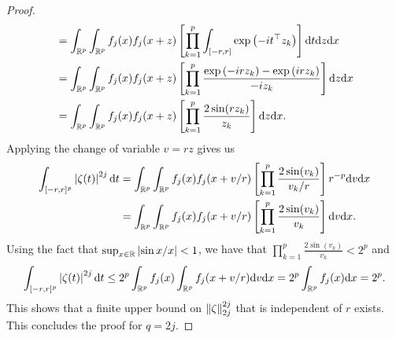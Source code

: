 \begin{proof}
\begin{align*}
        &= \intRp{x}{\intRp{z}{f_j(x)f_j(x + z)\left[\prod_{k=1}^p \int_{[-r, r]}\expf{-it^\top z_k}\right]\d t}}\\
        &= \intRp{x}{\intRp{z}{f_j(x)f_j(x + z)\left[\prod_{k=1}^p \frac{\expf{-irz_k} - \expf{irz_k}}{-iz_k} \right]}}\\
        &= \intRp{x}{\intRp{z}{f_j(x)f_j(x + z)\left[\prod_{k=1}^p \frac{2 \sin(rz_k)}{z_k} \right]}}.
    \end{align*}
    Applying the change of variable $v = r z$ gives us
    \begin{align*}
        \int_{[-r, r]^p} \abs{\zeta(t)}^{2j} \d t
        &= \intRp{x}{\intRp{v}{f_j(x)f_j(x + v/r)\left[\prod_{k=1}^p \frac{2 \sin(v_k)}{v_k/r} \right] r^{-p}}}\\
        &= \intRp{x}{\intRp{v}{f_j(x)f_j(x + v/r)\left[\prod_{k=1}^p \frac{2 \sin(v_k)}{v_k} \right]}}.
    \end{align*}
    Using the fact that $\sup_{x \in \R} \abs{\sin x / x} < 1$, we have that $\prod_{k=1}^p \frac{2 \sin(v_k)}{v_k} < 2^p$ and
    \begin{equation*}
        \int_{[-r, r]^p} \abs{\zeta(t)}^{2j} \d t
        \leq 2^p \intRp{x}{f_j(x)\intRp{v}{f_j(x + v/r)}}
        = 2^p \intRp{x}{f_j(x)} = 2^p.
    \end{equation*}
    This shows that a finite upper bound on $\norm{\zeta}_{2j}^{2j}$ that is independent of $r$ exists. This concludes the proof for $q = 2j$.
\end{proof}